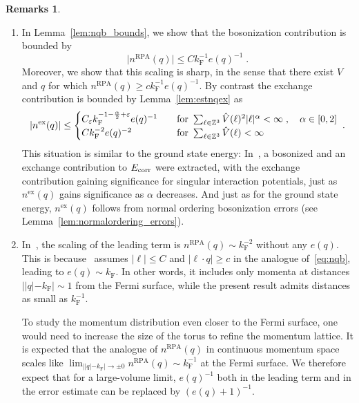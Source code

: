 \documentclass[12pt,a4paper]{article}
\numberwithin{equation}{section}
\newcommand{\1}{\mathbb{I}}
\newcommand{\ex}{\mathrm{ex}}
\newcommand{\F}{\mathrm{F}}
\newcommand{\RPA}{\mathrm{RPA}}
\newcommand{\Zstar}{\mathbb{Z}^3} %
\newcommand{\Z}{\mathbb{Z}}
\theoremstyle{plain}
\theoremstyle{definition}
\newtheorem*{remarks}{Remarks}
\theoremstyle{remark}
\theoremstyle{plain}
\theoremstyle{definition}
\theoremstyle{remark}
\begin{document}
\begin{remarks}
\begin{enumerate}

\item In Lemma~\ref{lem:nqb_bounds}, we show that the bosonization contribution is bounded by
\begin{equation}
	\lvert n^{\RPA}(q)\rvert \le C k_{\F}^{-1} e(q)^{-1} \;.
\end{equation}
Moreover, we show that this scaling is sharp, in the sense that there exist $ V $ and $ q $ for which $ n^{\RPA}(q) \ge c k_{\F}^{-1} e(q)^{-1} $. \todo{Make sure that $ n^{\RPA}(q) \ge c k_{\F}^{-1} e(q)^{-1} $ is true.}
By contrast the exchange contribution is bounded by Lemma~\ref{lem:estnqex} as
\begin{equation}
	\lvert n^{\ex}(q)\rvert
	\le \begin{cases}
		C_\varepsilon k_{\F}^{-1-\frac{\alpha}{2} + \varepsilon } e(q)^{-1} \quad&\textnormal{for } \sum_{\ell \in \Zstar} \hat{V}(\ell)^2 |\ell|^\alpha < \infty \;, \quad \alpha \in [0,2] \\
		C k_{\F}^{-2} e(q)^{-2} \quad&\textnormal{for } \sum_{\ell \in \Zstar} \hat{V}(\ell) < \infty
	\end{cases} \;.
\end{equation}
This situation is similar to the ground state energy: In~\cite{CHN23,CHN24}, a bosonized and an exchange contribution to $ E_{\textnormal{corr}} $ were extracted, with the exchange contribution gaining significance for singular interaction potentials, just as $ n^{\ex}(q) $ gains significance as $ \alpha $ decreases. And just as for the ground state energy, $ n^{\ex}(q) $ follows from normal ordering bosonization errors (see Lemma~\eqref{lem:normalordering_errors}).


\item In~\cite{BL25}, the scaling of the leading term is $ n^{\RPA}(q) \sim k_{\F}^{-2} $ without any $ e(q) $. This is because~\cite{BL25} assumes $ |\ell| \le C $ and $ |\ell \cdot q| \ge c $ in the analogue of~\eqref{eq:nqb}, leading to $ e(q) \sim k_{\F} $. In other words, it includes only momenta at distances $ ||q|-k_{\F}| \sim 1 $ from the Fermi surface, while the present result admits distances as small as $ k_{\F}^{-1} $.

To study the momentum distribution even closer to the Fermi surface, one would need to increase the size of the torus to refine the momentum lattice. It is expected \cite{DV60} that the analogue of $ n^{\RPA}(q) $ in continuous momentum space scales like $ \lim_{||q|-k_{\F}| \to \pm 0} n^{\RPA}(q) \sim k_{\F}^{-1} $ at the Fermi surface. We therefore expect that for a large-volume limit, $ e(q)^{-1} $ both in the leading term and in the error estimate can be replaced by $ (e(q)+1)^{-1} $.




\end{enumerate}
\end{remarks}
\end{document}
